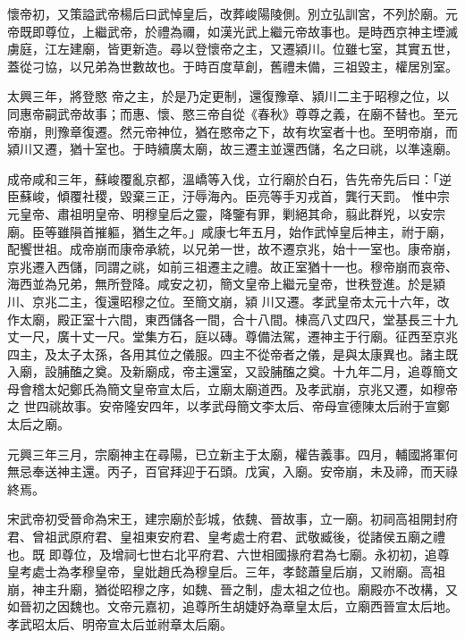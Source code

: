 \begin{pinyinscope}
 懷帝初，又策謚武帝楊后曰武悼皇后，改葬峻陽陵側。別立弘訓宮，不列於廟。元帝既即尊位，上繼武帝，於禮為禰，如漢光武上繼元帝故事也。是時西京神主堙滅虜庭，江左建廟，皆更新造。尋以登懷帝之主，又遷潁川。位雖七室，其實五世，蓋從刁協，以兄弟為世數故也。于時百度草創，舊禮未備，三祖毀主，權居別室。



 太興三年，將登愍
 帝之主，於是乃定更制，還復豫章、潁川二主于昭穆之位，以同惠帝嗣武帝故事；而惠、懷、愍三帝自從《春秋》尊尊之義，在廟不替也。至元帝崩，則豫章復遷。然元帝神位，猶在愍帝之下，故有坎室者十也。至明帝崩，而潁川又遷，猶十室也。于時續廣太廟，故三遷主並還西儲，名之曰祧，以準遠廟。



 成帝咸和三年，蘇峻覆亂京都，溫嶠等入伐，立行廟於白石，告先帝先后曰：「逆臣蘇峻，傾覆社稷，毀棄三正，汙辱海內。臣亮等手刃戎首，龔行天罰。
 惟中宗元皇帝、肅祖明皇帝、明穆皇后之靈，降鑒有罪，剿絕其命，翦此群兇，以安宗廟。臣等雖隕首摧軀，猶生之年。」咸康七年五月，始作武悼皇后神主，祔于廟，配饗世祖。成帝崩而康帝承統，以兄弟一世，故不遷京兆，始十一室也。康帝崩，京兆遷入西儲，同謂之祧，如前三祖遷主之禮。故正室猶十一也。穆帝崩而哀帝、海西並為兄弟，無所登降。咸安之初，簡文皇帝上繼元皇帝，世秩登進。於是潁川、京兆二主，復還昭穆之位。至簡文崩，潁
 川又遷。孝武皇帝太元十六年，改作太廟，殿正室十六間，東西儲各一間，合十八間。棟高八丈四尺，堂基長三十九丈一尺，廣十丈一尺。堂集方石，庭以磚。尊備法駕，遷神主于行廟。征西至京兆四主，及太子太孫，各用其位之儀服。四主不從帝者之儀，是與太康異也。諸主既入廟，設脯醢之奠。及新廟成，帝主還室，又設脯醢之奠。十九年二月，追尊簡文母會稽太妃鄭氏為簡文皇帝宣太后，立廟太廟道西。及孝武崩，京兆又遷，如穆帝之
 世四祧故事。安帝隆安四年，以孝武母簡文李太后、帝母宣德陳太后祔于宣鄭太后之廟。



 元興三年三月，宗廟神主在尋陽，已立新主于太廟，權告義事。四月，輔國將軍何無忌奉送神主還。丙子，百官拜迎于石頭。戊寅，入廟。安帝崩，未及禘，而天祿終焉。



 宋武帝初受晉命為宋王，建宗廟於彭城，依魏、晉故事，立一廟。初祠高祖開封府君、曾祖武原府君、皇祖東安府君、皇考處士府君、武敬臧後，從諸侯五廟之禮也。既
 即尊位，及增祠七世右北平府君、六世相國掾府君為七廟。永初初，追尊皇考處士為孝穆皇帝，皇妣趙氏為穆皇后。三年，孝懿蕭皇后崩，又祔廟。高祖崩，神主升廟，猶從昭穆之序，如魏、晉之制，虛太祖之位也。廟殿亦不改構，又如晉初之因魏也。文帝元嘉初，追尊所生胡婕妤為章皇太后，立廟西晉宣太后地。孝武昭太后、明帝宣太后並祔章太后廟。




\end{pinyinscope}
